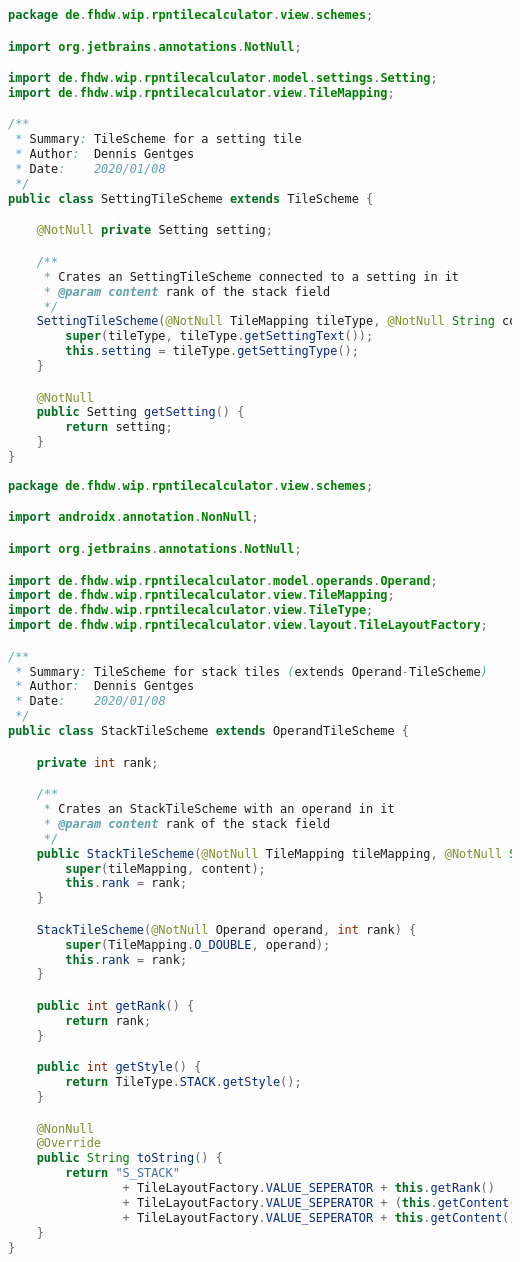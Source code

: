 \begin{lstlisting}[caption=SettingTileScheme,label=list:SettingTileScheme,language=Java]
package de.fhdw.wip.rpntilecalculator.view.schemes;

import org.jetbrains.annotations.NotNull;

import de.fhdw.wip.rpntilecalculator.model.settings.Setting;
import de.fhdw.wip.rpntilecalculator.view.TileMapping;

/**
 * Summary: TileScheme for a setting tile
 * Author:  Dennis Gentges
 * Date:    2020/01/08
 */
public class SettingTileScheme extends TileScheme {

    @NotNull private Setting setting;

    /**
     * Crates an SettingTileScheme connected to a setting in it
     * @param content rank of the stack field
     */
    SettingTileScheme(@NotNull TileMapping tileType, @NotNull String content) {
        super(tileType, tileType.getSettingText());
        this.setting = tileType.getSettingType();
    }

    @NotNull
    public Setting getSetting() {
        return setting;
    }
}
\end{lstlisting}    

\begin{lstlisting}[caption=StackTileScheme,label=list:StackTileScheme,language=Java]
package de.fhdw.wip.rpntilecalculator.view.schemes;

import androidx.annotation.NonNull;

import org.jetbrains.annotations.NotNull;

import de.fhdw.wip.rpntilecalculator.model.operands.Operand;
import de.fhdw.wip.rpntilecalculator.view.TileMapping;
import de.fhdw.wip.rpntilecalculator.view.TileType;
import de.fhdw.wip.rpntilecalculator.view.layout.TileLayoutFactory;

/**
 * Summary: TileScheme for stack tiles (extends Operand-TileScheme)
 * Author:  Dennis Gentges
 * Date:    2020/01/08
 */
public class StackTileScheme extends OperandTileScheme {

    private int rank;

    /**
     * Crates an StackTileScheme with an operand in it
     * @param content rank of the stack field
     */
    public StackTileScheme(@NotNull TileMapping tileMapping, @NotNull String content, int rank) {
        super(tileMapping, content);
        this.rank = rank;
    }

    StackTileScheme(@NotNull Operand operand, int rank) {
        super(TileMapping.O_DOUBLE, operand);
        this.rank = rank;
    }

    public int getRank() {
        return rank;
    }

    public int getStyle() {
        return TileType.STACK.getStyle();
    }

    @NonNull
    @Override
    public String toString() {
        return "S_STACK"
                + TileLayoutFactory.VALUE_SEPERATOR + this.getRank()
                + TileLayoutFactory.VALUE_SEPERATOR + (this.getContent() == " " ? "O_Empty" : this.getTileType())
                + TileLayoutFactory.VALUE_SEPERATOR + this.getContent();
    }
}
\end{lstlisting}    

